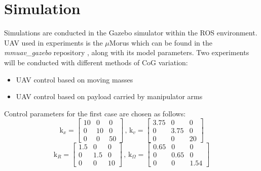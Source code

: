\section{Simulation}
Simulations are conducted in the Gazebo simulator within the ROS environment. UAV used in experiments is the $\mu$Morus which can be found in the \textit{mmuav\_gazebo} repository \cite{gitLink}, along with its model parameters. Two experiments will be conducted with different methods of CoG variation: 
\begin{itemize}
	\item UAV control based on moving masses
	\item UAV control based on payload carried by manipulator arms
\end{itemize}
Control parameters for the first case are chosen as follows:
\begin{equation*}
	\text{k}_x = 
	\begin{bmatrix}
		10 &  0  &  0 \\
		 0 & 10  &	0 \\ 
		 0 &  0  & 50 	
	\end{bmatrix}
	\, , \,	
	\text{k}_v =
	\begin{bmatrix}
		3.75 & 0 & 0 \\
		0 & 3.75 & 0 \\
		0 & 0 & 20
	\end{bmatrix}
\end{equation*}
\begin{equation*}
	\text{k}_R = 
	\begin{bmatrix}
		1.5 & 0 & 0 \\
		0 & 1.5 & 0 \\
		0 & 0 & 10
	\end{bmatrix}
	\, , \,
	\text{k}_\Omega = 
	\begin{bmatrix}
		0.65 & 0 & 0 \\
		0 & 0.65 & 0 \\
		0 & 0 & 1.54
	\end{bmatrix}
\end{equation*}

